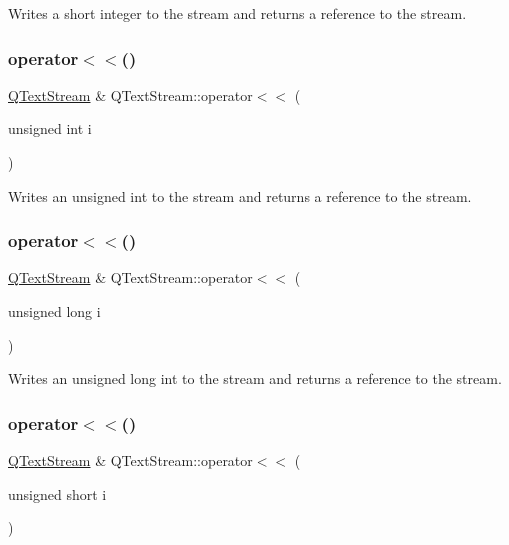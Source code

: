 Writes a {\ttfamily short} integer to the stream and returns a reference to the stream. \mbox{\label{class_q_text_stream_aff4f8bd3513a371838b5ec20be5a5889}} 
\subsubsection{\texorpdfstring{operator$<$$<$()}{operator<<()}\hspace{0.1cm}{\footnotesize\ttfamily [11/14]}}
{\footnotesize\ttfamily \mbox{\hyperlink{class_q_text_stream}{Q\+Text\+Stream}} \& Q\+Text\+Stream\+::operator$<$$<$ (\begin{DoxyParamCaption}\item[{unsigned int}]{i }\end{DoxyParamCaption})}

Writes an {\ttfamily unsigned} {\ttfamily int} to the stream and returns a reference to the stream. \mbox{\label{class_q_text_stream_a867f2838d846bc4472ddb5a48f254885}} 
\subsubsection{\texorpdfstring{operator$<$$<$()}{operator<<()}\hspace{0.1cm}{\footnotesize\ttfamily [12/14]}}
{\footnotesize\ttfamily \mbox{\hyperlink{class_q_text_stream}{Q\+Text\+Stream}} \& Q\+Text\+Stream\+::operator$<$$<$ (\begin{DoxyParamCaption}\item[{unsigned long}]{i }\end{DoxyParamCaption})}

Writes an {\ttfamily unsigned} {\ttfamily long} {\ttfamily int} to the stream and returns a reference to the stream. \mbox{\label{class_q_text_stream_a678a728c8ea87eacb59c32f58bf33d9a}} 
\subsubsection{\texorpdfstring{operator$<$$<$()}{operator<<()}\hspace{0.1cm}{\footnotesize\ttfamily [13/14]}}
{\footnotesize\ttfamily \mbox{\hyperlink{class_q_text_stream}{Q\+Text\+Stream}} \& Q\+Text\+Stream\+::operator$<$$<$ (\begin{DoxyParamCaption}\item[{unsigned short}]{i }\end{DoxyParamCaption})}

